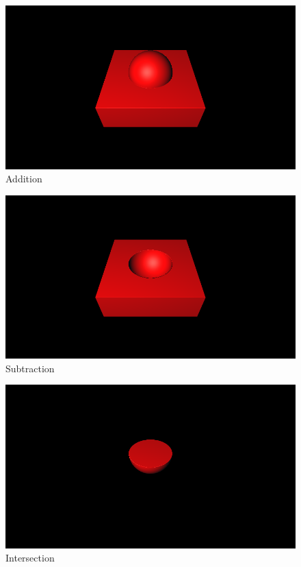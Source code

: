 \begin{figure}[h!]
    \centering

    \begin{minipage}{0.3\textwidth}
        \centering
        \includegraphics[width=\linewidth]{imagens/smooth-sdf-operations/add-unsmooth.png}\\
        Addition
    \end{minipage}%
    \hfill
    \begin{minipage}{0.3\textwidth}
        \centering
        \includegraphics[width=\linewidth]{imagens/smooth-sdf-operations/subtraction-unsmooth.png}\\
        Subtraction
    \end{minipage}%
    \hfill
    \begin{minipage}{0.3\textwidth}
        \centering
        \includegraphics[width=\linewidth]{imagens/smooth-sdf-operations/intersection-unsmooth.png}\\
        Intersection
    \end{minipage}


\end{figure}
